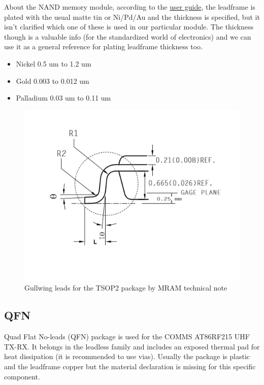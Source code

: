 \documentclass[final]{cubedoc}
\begin{document}
	About the NAND memory module, according to the \href{https://drive.google.com/file/d/1wkUdeeUTbI0Y1cVbS6Vn8aBa2U0LKccN/view?usp=sharing}{user guide}, the leadframe is plated with the usual matte tin or Ni/Pd/Au and the thickness is specified, but it isn't clarified which one of these is used in our particular module. The thickness though is a valuable info (for the standardized world of electronics) and we can use it as a general reference for plating leadframe thickness too.
	\begin{itemize}
		\item Nickel 0.5 um to 1.2 um
		\item Gold 0.003 to 0.012 um
		\item Palladium 0.03 um to 0.11 um
	\end{itemize}
	
	
	
	\begin{figure}[h!]
		\centering
		\includegraphics[height=0.3\textheight, width=\textwidth, keepaspectratio]{docs/gullwing_leads_TSOP.png}
		\caption{Gullwing leads for the TSOP2 package by MRAM technical note}
		\label{fig:my_label}
	\end{figure}
	
	\subsection{QFN}
	
	
	Quad Flat No-leads (QFN) package is used for the COMMS AT86RF215 UHF TX-RX. It belongs in the leadless family and includes an exposed thermal pad for heat dissipation (it is recommended to use vias). Usually the package is plastic and the leadframe copper but the material declaration is missing for this specific component. 
	
\end{document}
